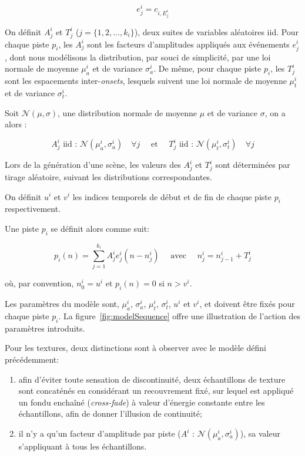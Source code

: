 \begin{equation}
e_j^i=c_{i,E_j^i}
\end{equation}

On définit $A^i_j$ et $T^i_j$ ($j=\lbrace 1,2,\ldots,k_i\rbrace$), deux suites de variables aléatoires iid. Pour chaque piste $p_i$, les $A^i_j$ sont les facteurs d'amplitudes appliqués aux événements $e_j^i$, dont nous modélisons la distribution, par souci de simplicité, par une loi normale de moyenne $\mu_a^i$ et de variance $\sigma_a^i$. De même, pour chaque piste $p_i$, les $T_j^i$ sont les espacements inter-\emph{onsets}, lesquels suivent une loi normale de moyenne $\mu_t^i$ et de variance $\sigma_t^i$.

Soit $\mathcal{N}(\mu,\sigma)$, une distribution normale de moyenne $\mu$ et de variance $\sigma$, on a alors :

\begin{equation}
\label{eq:ch4_eq1}
A_j^i \textrm{ iid : } \mathcal{N}(\mu_a^{i},\sigma_a^{i}) \quad \forall j \quad \textrm{ et } \quad T_j^i \textrm{ iid : } \mathcal{N}({\mu_t^{i},\sigma_t^{i}}) \quad \forall j
\end{equation}

Lors de la génération d'une scène, les valeurs des $A^i_j$ et $T_j^i$ sont déterminées par tirage aléatoire, suivant les distributions correspondantes.

On définit $u^i$ et $v^i$ les indices temporels de début et de fin de chaque piste $p_i$ respectivement.

Une piste $p_i$ se définit alors comme suit:

\begin{equation}
\label{eq:ch4_eq2}
p_{i}(n)= \sum_{j=1}^{k_i} A_j^i e_j^i(n-n_j^i) \quad \textrm{ avec } \quad n_j^i=n_{j-1}^i + T_j^i
\end{equation}

où, par convention, $n^i_0=u^i$ et $p_i(n)=0$ si $n>v^i$.

Les paramètres du modèle sont, $\mu_a^i$, $\sigma_a^i$, $\mu_t^i$, $\sigma_t^i$, $u^i$ et $v^i$, et doivent être fixés pour chaque piste $p_i$. La figure~\ref{fig:modelSequence} offre une illustration de l'action des paramètres introduits.

Pour les textures, deux distinctions sont à observer avec le modèle défini précédemment:

\begin{enumerate}
\item afin d'éviter toute sensation de discontinuité, deux échantillons de texture sont concaténés en considérant un recouvrement fixé, sur lequel est appliqué un fondu enchaîné (\emph{cross-fade}) à valeur d'énergie constante entre les échantillons, afin de donner l'illusion de continuité;
\item il n'y a qu'un facteur d'amplitude par piste ($A^i \textrm{ : } \mathcal{N}(\mu_a^{i},\sigma_a^{i})$), sa valeur s'appliquant à tous les échantillons.
\end{enumerate}

